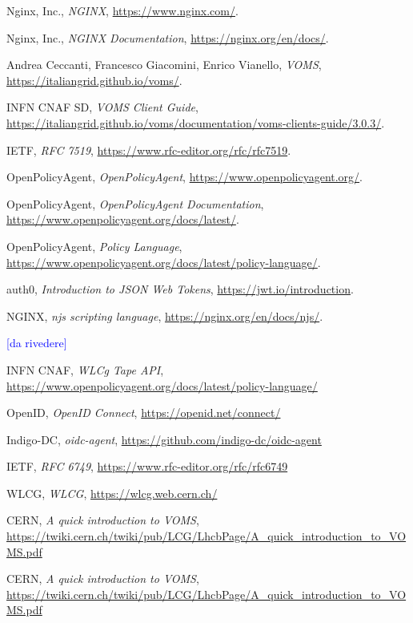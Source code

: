 \begin{thebibliography}{99}

	Nginx, Inc.,
	\textit{NGINX},
	\url{https://www.nginx.com/}.

	Nginx, Inc.,
	\textit{NGINX Documentation},
	\url{https://nginx.org/en/docs/}.

	Andrea Ceccanti, Francesco Giacomini, Enrico Vianello,
	\textit{VOMS},
	\url{https://italiangrid.github.io/voms/}.

	INFN CNAF SD,
	\textit{VOMS Client Guide},
	\url{https://italiangrid.github.io/voms/documentation/voms-clients-guide/3.0.3/}.

	IETF,
	\textit{RFC 7519},
	\url{https://www.rfc-editor.org/rfc/rfc7519}.

	OpenPolicyAgent,
	\textit{OpenPolicyAgent},
	\url{https://www.openpolicyagent.org/}.

	OpenPolicyAgent,
	\textit{OpenPolicyAgent Documentation},
	\url{https://www.openpolicyagent.org/docs/latest/}.

	OpenPolicyAgent,
	\textit{Policy Language},
	\url{https://www.openpolicyagent.org/docs/latest/policy-language/}.

	auth0, \textit{Introduction to JSON Web Tokens},
	\url{https://jwt.io/introduction}. 

	NGINX,
	\textit{njs scripting language},
	\url{https://nginx.org/en/docs/njs/}.

	\textcolor{blue}{[da rivedere]}
    
	INFN CNAF,
	\textit{WLCg Tape API},
	\url{https://www.openpolicyagent.org/docs/latest/policy-language/}

	OpenID, 
	\textit{OpenID Connect},
	\url{https://openid.net/connect/}

	Indigo-DC, \textit{oidc-agent}, 
	\url{https://github.com/indigo-dc/oidc-agent}

	IETF, 
	\textit{RFC 6749},
	\url{https://www.rfc-editor.org/rfc/rfc6749}

	WLCG, 
	\textit{WLCG},
	\url{https://wlcg.web.cern.ch/}

	CERN, \textit{A quick introduction to VOMS},
	\url{https://twiki.cern.ch/twiki/pub/LCG/LhcbPage/A_quick_introduction_to_VOMS.pdf}

	CERN, \textit{A quick introduction to VOMS},
	\url{https://twiki.cern.ch/twiki/pub/LCG/LhcbPage/A_quick_introduction_to_VOMS.pdf}

\end{thebibliography}